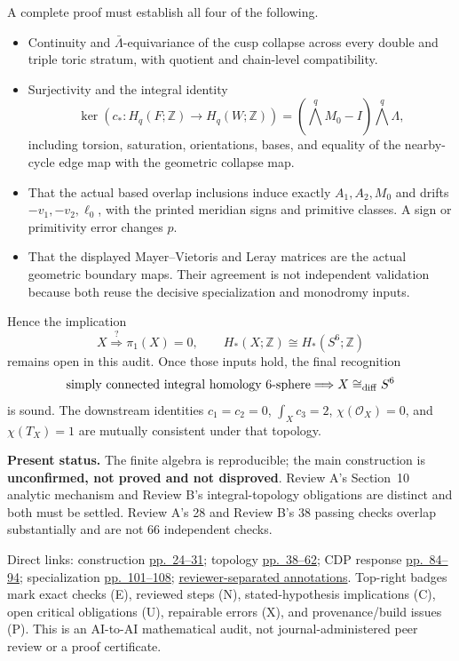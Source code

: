 {\begin{minipage}[t]{0.478\textwidth}
A complete proof must establish all four of the following.
\GuideTightList
\begin{itemize}
\item Continuity and $\bar\Lambda$-equivariance of the cusp collapse across every double and triple toric stratum, with quotient and chain-level compatibility.
\item Surjectivity and the integral identity
\[
\ker\!\left(c_*:H_q(F;\mathbb Z)\to H_q(W;\mathbb Z)\right)
=(\bigwedge^qM_0-I)\bigwedge^q\Lambda,
\]
including torsion, saturation, orientations, bases, and equality of the nearby-cycle edge map with the geometric collapse map.
\item That the actual based overlap inclusions induce exactly $A_1,A_2,M_0$ and drifts $-v_1,-v_2,\ell_0$, with the printed meridian signs and primitive classes. A sign or primitivity error changes $p$.
\item That the displayed Mayer--Vietoris and Leray matrices are the actual geometric boundary maps. Their agreement is not independent validation because both reuse the decisive specialization and monodromy inputs.
\end{itemize}

Hence the implication
\[
X\stackrel{?}{\Longrightarrow}
\pi_1(X)=0,\qquad H_*(X;\mathbb Z)\cong H_*(S^6;\mathbb Z)
\]
remains open in this audit. Once those inputs hold, the final recognition
\[
\text{simply connected integral homology }6\text{-sphere}
\Longrightarrow X\cong_{\rm diff}S^6
\]
is sound. The downstream identities $c_1=c_2=0$, $\int_Xc_3=2$, $\chi(\mathcal O_X)=0$, and $\chi(T_X)=1$ are mutually consistent under that topology.
\end{minipage}

\vspace{2.5pt}
\noindent\textbf{Present status.} The finite algebra is reproducible; the main construction is \textbf{unconfirmed, not proved and not disproved}. Review A's Section~10 analytic mechanism and Review B's integral-topology obligations are distinct and both must be settled. Review A's 28 and Review B's 38 passing checks overlap substantially and are not 66 independent checks.

\vfill
{\fontsize{6.25pt}{7.1pt}\selectfont\color{AuditProvenance}
Direct links: construction \hyperlink{s6-source-page-024}{pp.~24--31}; topology \hyperlink{s6-source-page-038}{pp.~38--62}; CDP response \hyperlink{s6-source-page-084}{pp.~84--94}; specialization \hyperlink{s6-source-page-101}{pp.~101--108}; \hyperlink{audit-page-1}{reviewer-separated annotations}. Top-right badges mark exact checks (E), reviewed steps (N), stated-hypothesis implications (C), open critical obligations (U), repairable errors (X), and provenance/build issues (P). This is an AI-to-AI mathematical audit, not journal-administered peer review or a proof certificate.}
}
\endgroup
